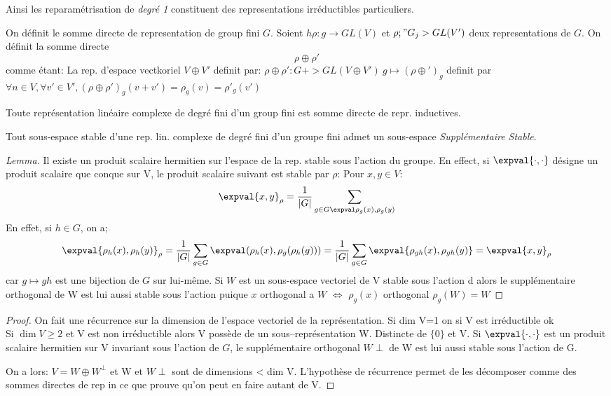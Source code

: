 Ainsi les reparamétrisation de \emph{degré 1} constituent des representations irréductibles particuliers.

\begin{theorem}
	On définit le somme directe de representation de group fini $G$. Soient $h\rho:g\rightarrow GL(V)$ et $\rho;"G_j>GL(V')$ deux representations de $G$. On définit la somme directe
	$$\rho\oplus \rho'$$ comme étant:
	La rep. d'espace vectkoriel $V\oplus V'$ definit par:
	$\rho\oplus\rho': G+> GL(V\oplus V')\ g\mapsto(\rho\oplus')_g$ definit par $\forall n\in V, \forall v'\in V', (\rho\oplus \rho')_g(v+v')=\rho_g(v)=\rho'_g(v')$
	
	Toute représentation linéaire complexe de degré fini d'un group fini est somme directe de repr. inductives.
\end{theorem}

\begin{lemme}
	Tout sous-espace stable d'une rep. lin. complexe de degré fini d'un groupe fini admet un sous-espace \emph{Supplémentaire Stable}.
\end{lemme}
\begin{proof}[Lemma]
	Il existe un produit scalaire hermitien sur l'espace de la rep. stable sous l'action du groupe. En effect, si $\expval{\cdot,\cdot}$ désigne un produit scalaire que conque sur V, le produit scalaire suivant est stable par $\rho$:
	Pour $x,y\in V$:
	$$\expval{x,y}_\rho=\frac 1{|G|}\sum_{g\in G\expval\rho_g(x),\rho_g(y)}$$
	En effet, si $h\in G$, on a;
	$$\expval{\rho_h(x),\rho_h(y)}_\rho=\frac 1{|G|}\sum_{g\in G}\expval(\rho_h(x),\rho_g(\rho_h(g)))=\frac 1{|G|}\sum_{g\in G}\expval{\rho_{gh}(x),\rho_{gh}(y)} = \expval{x,y}_\rho$$ car $g\mapsto gh$ est une bijection de $G$ sur lui-même.
	Si $W$ est un sous-espace vectoriel de V stable sous l'action d  alors le supplémentaire orthogonal de W est lui aussi stable sous l'action puique $x$ orthogonal a $W$ $\Leftrightarrow$ $\rho_g(x)$ orthogonal $\rho_g(W)=W$
\end{proof}
\begin{proof}
	On fait une récurrence sur la dimension de l'espace vectoriel de la représentation.
	Si dim V=1 on si V est irréductible ok\\
	Si $\dim V \geq 2$ et V est non irréductible alors V possède de un sous--représentation W. Distincte de $\{0\}$ et V.
	Si $\expval{\cdot, \cdot}$ est un produit scalaire hermitien sur V invariant sous l'action de $G$, le supplémentaire orthogonal $W\perp$ de W est lui aussi stable sous l'action de G.
	
	On a lors: $V=W\oplus W^\perp$ et W et $W\perp$ sont de dimensions < dim V.
	L'hypothèse de récurrence permet de les décomposer comme des sommes directes de rep in ce que prouve qu'on peut en faire autant de V.
\end{proof}

